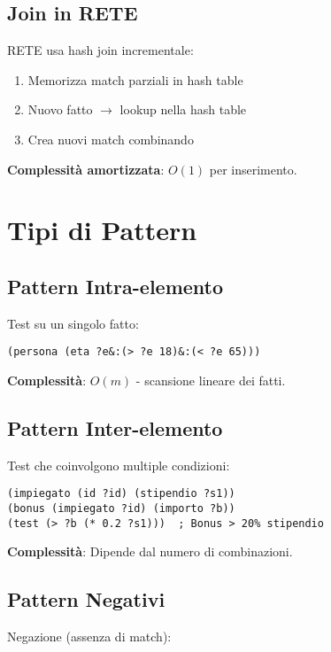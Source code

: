 \subsection{Join in RETE}

RETE usa hash join incrementale:
\begin{enumerate}
\item Memorizza match parziali in hash table
\item Nuovo fatto $\rightarrow$ lookup nella hash table
\item Crea nuovi match combinando
\end{enumerate}

\textbf{Complessità amortizzata}: $O(1)$ per inserimento.

\section{Tipi di Pattern}

\subsection{Pattern Intra-elemento}

Test su un singolo fatto:

\begin{lstlisting}[language=CLIPS]
(persona (eta ?e&:(> ?e 18)&:(< ?e 65)))
\end{lstlisting}

\textbf{Complessità}: $O(m)$ - scansione lineare dei fatti.

\subsection{Pattern Inter-elemento}

Test che coinvolgono multiple condizioni:

\begin{lstlisting}[language=CLIPS]
(impiegato (id ?id) (stipendio ?s1))
(bonus (impiegato ?id) (importo ?b))
(test (> ?b (* 0.2 ?s1)))  ; Bonus > 20% stipendio
\end{lstlisting}

\textbf{Complessità}: Dipende dal numero di combinazioni.

\subsection{Pattern Negativi}

Negazione (assenza di match):

